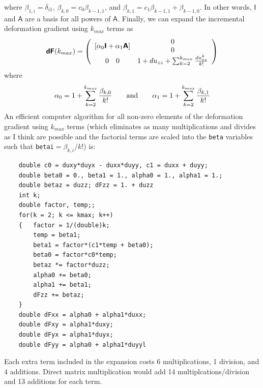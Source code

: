 \documentclass[11pt]{article}
\newcommand{\tens}[1]{\boldsymbol{\mathsf{#1}}}
\begin{document}
where $\beta_{1,i} = \delta_{i1}$, $\beta_{k,0}=c_0\beta_{k-1,1}$, and $\beta_{k,1}=c_1\beta_{k-1,1} + \beta_{k-1,0}$. In other words, $\tens I$ and $\tens A$ are a basis for all powers of $\tens A$. Finally, we can expand the incremental deformation gradient using $k_{max}$ terms as
\begin{equation}
    \tens{dF}({k_{max}}) = \left(\begin{array}{cc}
                [\alpha_0\tens I + \alpha_1\tens A] & \begin{array}{c} 0 \\ 0 \end{array} \\
                 0 \quad 0  & 1 + du_{zz} + \sum_{k=2}^{k_{max}} {du_{zz}^k\over k!}
              \end{array}\right)
\end{equation}
where
\begin{equation}
      \alpha_0 = 1 + \sum_{k=2}^{k_{max}} {\beta_{k,0}\over k!} \qquad {\rm and} \qquad
      \alpha_1 = 1 + \sum_{k=2}^{k_{max}} {\beta_{k,1}\over k!}
\end{equation}
An efficient computer algorithm for all non-zero elements of the deformation gradient using $k_{max}$ terms (which eliminates as many multiplications and divides as I think are possible and the factorial terms are scaled into the {\tt beta} variables such that {\tt betai}$=\beta_{k,i}/k!$) is:
\begin{verbatim}
    double c0 = duxy*duyx - duxx*duyy, c1 = duxx + duyy;
    double beta0 = 0., beta1 = 1., alpha0 = 1., alpha1 = 1.;
    double betaz = duzz; dFzz = 1. + duzz
    int k;
    double factor, temp;;
    for(k = 2; k <= kmax; k++)
    {   factor = 1/(double)k;
        temp = beta1;
        beta1 = factor*(c1*temp + beta0);
        beta0 = factor*c0*temp;
        betaz *= factor*duzz;
        alpha0 += beta0;
        alpha1 += beta1;
        dFzz += betaz;
    }
    double dFxx = alpha0 + alpha1*duxx;
    double dFxy = alpha1*duxy;
    double dFyx = alpha1*duyx;
    double dFyy = alpha0 + alpha1*duyyl
\end{verbatim}
Each extra term included in the expansion costs 6 multiplications, 1 division, and 4 additions. Direct matrix multiplication would add 14 multiplcations/division and 13 additions for each term.
\end{document}
